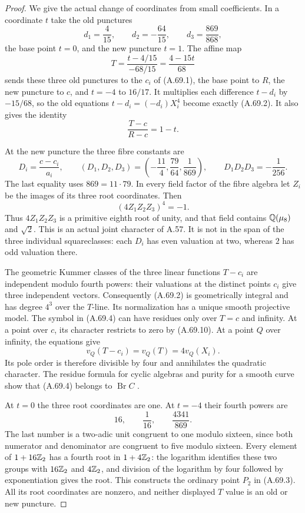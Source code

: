 \begin{proof}
We give the actual change of coordinates from small coefficients.
In a coordinate $t$ take the old punctures
\[
 d_1=\frac4{15},\qquad d_2=-\frac{64}{15},
                 \qquad d_3=\frac{869}{868},
 \tag{A.69.6}
\]
the base point $t=0$, and the new puncture $t=1$.
The affine map
\[
            T=\frac{t-4/15}{-68/15}
                      =\frac{4-15t}{68}
 \tag{A.69.7}
\]
sends these three old punctures to the $c_i$ of (A.69.1),
the base point to $R$, the new puncture to $c$, and $t=-4$
to $16/17$.  It multiplies each difference $t-d_i$ by
$-15/68$, so the old equations
$t-d_i=(-d_i)X_i^4$ become exactly (A.69.2).
It also gives the identity
\[
                         \frac{T-c}{R-c}=1-t.
 \tag{A.69.8}
\]

At the new puncture the three fibre constants are
\[
 D_i=\frac{c-c_i}{a_i},\qquad
 (D_1,D_2,D_3)=
             \left(-\frac{11}{4},\frac{79}{64},\frac1{869}\right),
 \qquad D_1D_2D_3=-\frac1{256}.
 \tag{A.69.9}
\]
The last equality uses $869=11\cdot79$.
In every field factor of the fibre algebra let $Z_i$ be
the images of its three root coordinates.  Then
\[
                         (4Z_1Z_2Z_3)^4=-1.
 \tag{A.69.10}
\]
Thus $4Z_1Z_2Z_3$ is a primitive eighth root of unity,
and that field contains $\mathbb Q(\mu_8)$ and $\sqrt2$.
This is an actual joint character of A.57.
It is not in the span of the three individual squareclasses:
each $D_i$ has even valuation at two, whereas $2$ has odd
valuation there.

The geometric Kummer classes of the three linear functions
$T-c_i$ are independent modulo fourth powers: their valuations
at the distinct points $c_i$ give three independent vectors.
Consequently (A.69.2) is geometrically integral and has degree
$4^3$ over the $T$-line.  Its normalization has a unique smooth
projective model.  The symbol in (A.69.4) can have residues only
over $T=c$ and infinity.  At a point over $c$, its character
restricts to zero by (A.69.10).  At a point $Q$ over infinity,
the equations give
\[
              v_Q(T-c_i)=v_Q(T)=4v_Q(X_i).
 \tag{A.69.11}
\]
Its pole order is therefore divisible by four and annihilates
the quadratic character.  The residue formula for cyclic
algebras and purity for a smooth curve show that (A.69.4)
belongs to $\operatorname{Br}C$
\cite[\S1.4 and Corollary 3.7.3]{AgentCTSkoro2019}.

At $t=0$ the three root coordinates are one.  At $t=-4$
their fourth powers are
\[
             16,\qquad\frac1{16},\qquad\frac{4341}{869}.
 \tag{A.69.12}
\]
The last number is a two-adic unit congruent to one modulo
sixteen, since both numerator and denominator are congruent
to five modulo sixteen.  Every element of $1+16\mathbb Z_2$ has
a fourth root in $1+4\mathbb Z_2$: the logarithm identifies these
two groups with $16\mathbb Z_2$ and $4\mathbb Z_2$, and division of the
logarithm by four followed by exponentiation gives the root.
This constructs the ordinary point $P_2$ in (A.69.3).
All its root coordinates are nonzero, and neither displayed
$T$ value is an old or new puncture.


\end{proof}
